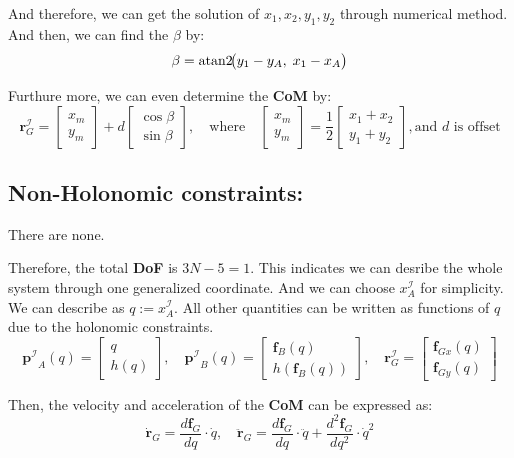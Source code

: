\documentclass[11pt]{article}
\begin{document}
And therefore, we can get the solution of \(x_1, x_2, y_1, y_2\) through numerical method. 
And then, we can find the \(\beta\) by: 
\[
\beta = \operatorname{atan2}\!\bigl(y_1 - y_A,\; x_1 - x_A\bigr) \\[6pt]
\]  

Furthure more, we can even determine the \textbf{CoM} by: 
\[
\mathbf{r}_G^\mathcal{I} =
\begin{bmatrix}
x_m \\
y_m
\end{bmatrix}
+
d \begin{bmatrix}
\cos\beta \\
\sin\beta
\end{bmatrix},
\quad
\text{where} \quad
\begin{bmatrix}
x_m \\
y_m
\end{bmatrix}
=
\frac{1}{2}
\begin{bmatrix}
x_1 + x_2 \\
y_1 + y_2
\end{bmatrix},
\text{and } d 
\text{ is offset} 
\]

\subsection{Non-Holonomic constraints:}
\indent \indent There are none.

\vspace{10pt}
Therefore, the total \textbf{DoF} is \(3N-5 =1\). This indicates we can desribe the whole system through one generalized
coordinate. And we can choose \(x_{A}^{\mathcal{I}}\) for simplicity. We can describe as \( q := x_A^\mathcal{I} \). All other quantities can be written as functions of \( q \) due to the holonomic constraints.
\[
\mathbf{p^\mathcal{I}}_A(q) =
\begin{bmatrix}
q \\
h(q)
\end{bmatrix}, \quad
\mathbf{p^\mathcal{I}}_B(q) =
\begin{bmatrix}
\mathbf{f}_B(q) \\
h(\mathbf{f}_B(q))
\end{bmatrix}, \quad
\mathbf{r}_G^\mathcal{I} =
\begin{bmatrix}
\mathbf{f}_{Gx}(q) \\
\mathbf{f}_{Gy}(q)
\end{bmatrix}
\]

Then, the velocity and acceleration of the \textbf{CoM} can be expressed as:
\[
\dot{\mathbf{r}}_G = \frac{d \mathbf{f}_G}{dq} \cdot \dot{q}, \quad
\ddot{\mathbf{r}}_G = \frac{d \mathbf{f}_G}{dq} \cdot \ddot{q} + \frac{d^2 \mathbf{f}_G}{dq^2} \cdot \dot{q}^2
\]
\end{document}
